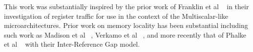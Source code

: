 This work was substantially inspired by the prior work 
of Franklin et al ~\cite{Franklin92}
in their investigation of register traffic
for use in the context of the Multiscalar-like microarchitectures.
Prior work on memory locality has been substantial including
such work as Madison et al ~\cite{madison76characteristics},
Verkamo et al ~\cite{verkamo85emperical}, and more recently
that of Phalke et al ~\cite{phalke95gap} with their Inter-Reference
Gap model.


